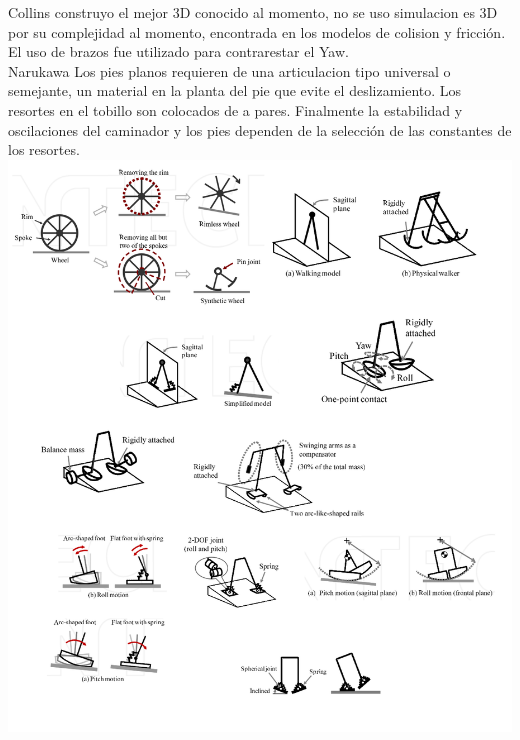 \documentclass[10pt,onecolumn,twoside,letterpaper]{article}
\begin{document}
Collins construyo el mejor 3D conocido al momento, no se uso simulacion es 3D por su complejidad al momento, encontrada en los modelos de colision y fricci\'on. El uso de brazos fue utilizado para contrarestar el Yaw. \\
Narukawa Los pies planos requieren de una articulacion tipo universal o semejante, un material en la planta del pie que evite el deslizamiento. Los resortes en el tobillo son colocados de a pares. Finalmente la estabilidad y oscilaciones del caminador y los pies dependen de la selecci\'on de las constantes de los resortes.\\
\includegraphics[scale=0.3]{../../images/PWDEvolution.png}\\\cite{Narukawa2010}\\
\end{document}
